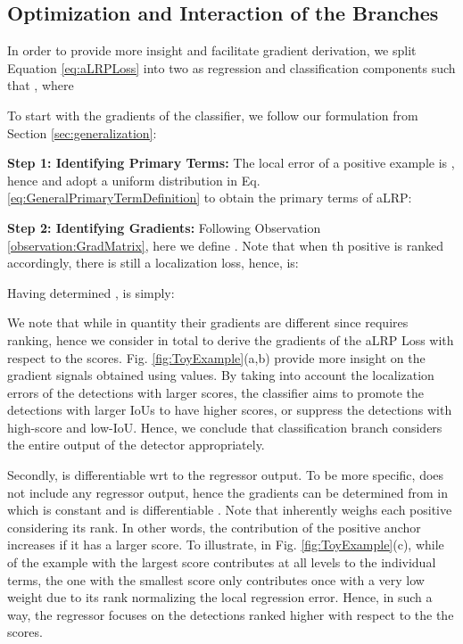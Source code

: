 \documentclass{article}
\begin{document}
{\subsection{Optimization and Interaction of the Branches}
In order to provide more insight and facilitate gradient derivation, we split Equation \ref{eq:aLRPLoss} into two as regression and classification components such that , where


To start with the gradients of the classifier, we follow our formulation from Section \ref{sec:generalization}:

\textbf{Step 1: Identifying Primary Terms:} The local error of a positive example is , hence  and adopt a uniform distribution in Eq. \ref{eq:GeneralPrimaryTermDefinition} to obtain the primary terms of aLRP:



\textbf{Step 2: Identifying Gradients:} Following Observation \ref{observation:GradMatrix}, here we define . Note that when th positive is ranked accordingly, there is still a localization loss, hence,  is:

Having determined ,  is simply:

We note that while  in quantity their gradients are different since  requires ranking, hence we consider  in total to derive the gradients of the aLRP Loss with respect to the scores. Fig. \ref{fig:ToyExample}(a,b) provide more insight on the gradient signals obtained using  values. By taking into account the localization errors of the detections with larger scores, the classifier aims to promote the detections with larger IoUs to have higher scores, or suppress the detections with high-score and low-IoU. Hence, we conclude that classification branch considers the entire output of the detector appropriately.

Secondly,  is differentiable wrt to the regressor output. To be more specific,  does not include any regressor output, hence the gradients can be determined from  in which  is constant and  is differentiable \cite{UnitBox,GIoULoss,DIoULoss}. Note that  inherently weighs each positive considering its rank. In other words, the contribution of the positive anchor increases if it has a larger score. To illustrate, in Fig. \ref{fig:ToyExample}(c), while  of the example with the largest score contributes at all levels to the individual  terms, the one with the smallest score only contributes once with a very low weight due to its rank normalizing the local regression error. Hence, in such a way, the regressor focuses on the detections ranked higher with respect to the the scores.
 




}
\end{document}
